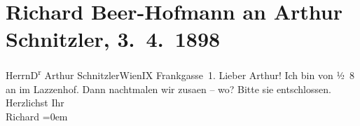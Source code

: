 

         \renewcommand{\erwaehnteOrte}{Orte: Frankgasse, Hoyoshof, I., Innere Stadt, IX., Alsergrund, Wien}
         \renewcommand{\erwaehnteWerke}{}
               \section[Richard Beer-Hofmann an Arthur Schnitzler, 3. 4. 1898]{ Richard Beer-Hofmann an Arthur Schnitzler, 3. 4. 1898}\nopagebreak{}\rehead{ }\begin{ledgroupsized}[t]{13cm}\normalsize\beginnumbering \toendnotes[C]{\smallbreak\pagebreak[2]} 
\toendnotes[C]{\smallbreak}\pstart{}{\pb}Herrn\pend{}\pstart{}D\textsuperscript{r} Arthur Schnitzler\pend{}\pstart{}Wien\pend{}\pstart{}IX Frankgasse 1.\hspace*{2.5em}\strikeout{\textcolor{gray}{×}}\pend{}{\bigskip}\pstart
           \noindent{}{\pb}Lieber Arthur! Ich bin
               von ½ 8 an im Lazzenhof. Dann
               nachtmalen wir zusa{\geminationm}en – wo? Bitte \label{T_L00790_1v}\label{T_L00790_1h} sie entschlossen.\pend
           \pstart
           Herzlichst Ihr {\\[\baselineskip]}\spacefill\mbox{Richard}\pend
           \leftskip=0em{}
         
         \endnumbering{}\end{ledgroupsized}  \newcommand{\dateiname}{L00790}\newcommand{\titel}{Richard Beer-Hofmann an Arthur Schnitzler, 3. 4. 1898}\newcommand{\editorInnen}{Martin Anton Müller und Gerd-Hermann Susen}
      
